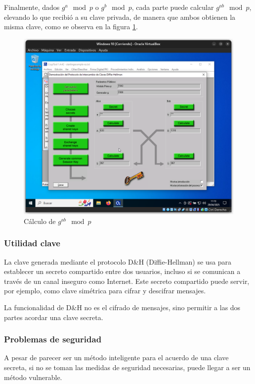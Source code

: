 Finalmente, dados $g^a\mod{p}$ o $g^b\mod{p}$, cada parte puede calcular $g^{ab}\mod{p}$, elevando lo que recibió a su clave privada, de manera que ambos obtienen la misma clave, como se observa en la figura \ref{fig:gabmodp}.

\begin{figure}[H]
    \includegraphics[width=\textwidth]{D&H-6.png}
    \caption{Cálculo de $g^{ab}\mod{p}$}
    \label{fig:gabmodp}
\end{figure}


\subsubsection{Utilidad clave}

La clave generada mediante el protocolo D\&H (Diffie-Hellman) se usa para establecer un secreto compartido entre dos usuarios, incluso si se comunican a través de un canal inseguro como Internet. Este secreto compartido puede servir, por ejemplo, como clave simétrica para cifrar y descifrar mensajes. 

La funcionalidad de D\&H no es el cifrado de mensajes, sino permitir a las dos partes acordar una clave secreta. 


\subsubsection{Problemas de seguridad}

A pesar de parecer ser un método inteligente para el acuerdo de una clave secreta, si no se toman las medidas de seguridad necesarias, puede llegar a ser un método vulnerable.  

